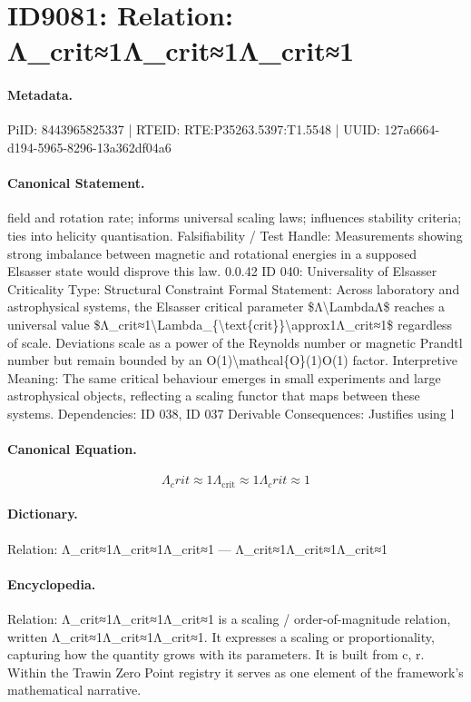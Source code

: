 \section*{ID9081: Relation: Λ\_crit≈1Λ\_crit≈1Λ\_crit≈1}
\paragraph{Metadata.}
PiID: 8443965825337 | RTEID: RTE:P35263.5397:T1.5548 | UUID: 127a6664-d194-5965-8296-13a362df04a6

\paragraph{Canonical Statement.}
field and rotation rate; informs universal scaling laws; influences stability criteria; ties into helicity quantisation. Falsifiability / Test Handle: Measurements showing strong imbalance between magnetic and rotational energies in a supposed Elsasser state would disprove this law. 0.0.42 ID 040: Universality of Elsasser Criticality Type: Structural Constraint Formal Statement: Across laboratory and astrophysical systems, the Elsasser critical parameter \$Λ\textbackslash{}LambdaΛ\$ reaches a universal value \$Λ\_crit≈1\textbackslash{}Lambda\_\{\textbackslash{}text\{crit\}\}\textbackslash{}approx1Λ\_crit≈1\$ regardless of scale. Deviations scale as a power of the Reynolds number or magnetic Prandtl number but remain bounded by an O(1)\textbackslash{}mathcal\{O\}(1)O(1) factor. Interpretive Meaning: The same critical behaviour emerges in small experiments and large astrophysical objects, reflecting a scaling functor that maps between these systems. Dependencies: ID 038, ID 037 Derivable Consequences: Justifies using l

\paragraph{Canonical Equation.}
\[
Λ_crit≈1\Lambda_{\text{crit}}\approx1Λ_crit≈1
\]

\paragraph{Dictionary.}
Relation: Λ\_crit≈1Λ\_crit≈1Λ\_crit≈1 — Λ\_crit≈1Λ\_crit≈1Λ\_crit≈1

\paragraph{Encyclopedia.}
Relation: Λ\_crit≈1Λ\_crit≈1Λ\_crit≈1 is a scaling / order-of-magnitude relation, written Λ\_crit≈1Λ\_crit≈1Λ\_crit≈1. It expresses a scaling or proportionality, capturing how the quantity grows with its parameters. It is built from c, r. Within the Trawin Zero Point registry it serves as one element of the framework's mathematical narrative.
